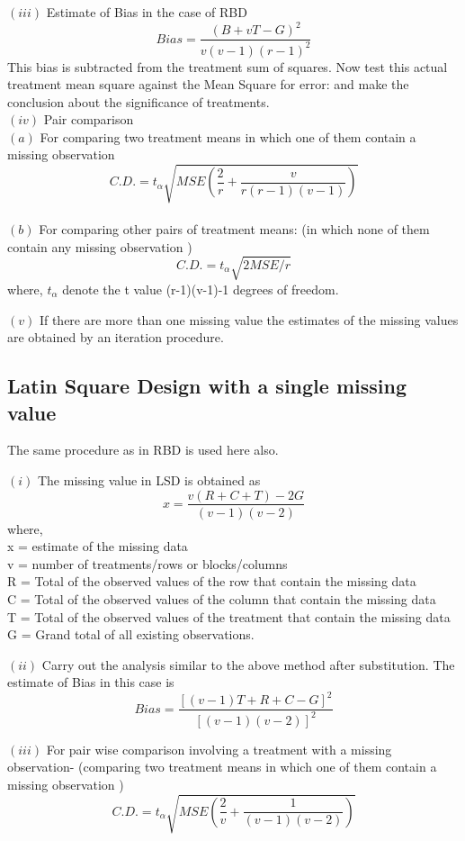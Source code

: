 \documentclass[
]{book}
\begin{document}
\((iii)\) Estimate of Bias in the case of RBD
\[Bias=\frac{(B+vT-G)^2}{v(v-1)(r-1)^2}\]
This bias is subtracted from the treatment sum of squares. Now test this actual
treatment mean square against the Mean Square for error: and make the conclusion about the significance of treatments.\\
\((iv)\) Pair comparison\\
\((a)\) For comparing two treatment means in which one of them contain a missing observation
\[C.D. = t_{\alpha}\sqrt{MSE(\frac{2}{r}+\frac{v}{r(r-1)(v-1)})}\]\\
\((b)\) For comparing other pairs of treatment means: (in which none of
them contain any missing observation )\\
\[C.D. = t_{\alpha}\sqrt{2MSE/r}\]
where, \(t_{\alpha}\) denote the t value (r-1)(v-1)-1 degrees of freedom.

\((v)\) If there are more than one missing value the estimates of the missing
values are obtained by an iteration procedure.

\hypertarget{latin-square-design-with-a-single-missing-value}{%
\subsection{Latin Square Design with a single missing value}\label{latin-square-design-with-a-single-missing-value}}

The same procedure as in RBD is used here also.

\((i)\) The missing value in LSD is obtained as
\[x=\frac{v(R+C+T)-2G}{(v-1)(v-2)}\]
where,\\
x = estimate of the missing data\\
v = number of treatments/rows or blocks/columns\\
R = Total of the observed values of the row that contain the missing data\\
C = Total of the observed values of the column that contain the missing data\\
T = Total of the observed values of the treatment that contain the missing data\\
G = Grand total of all existing observations.

\((ii)\) Carry out the analysis similar to the above method after substitution. The estimate of Bias in this case is
\[Bias=\frac{[(v-1)T+R+C-G]^2}{[(v-1)(v-2)]^2}\]

\((iii)\) For pair wise comparison involving a treatment with a missing observation- (comparing two treatment means in which one of them contain a missing observation )\\
\[C.D. = t_{\alpha}\sqrt{MSE(\frac{2}{v}+\frac{1}{(v-1)(v-2)})}\]
\end{document}

